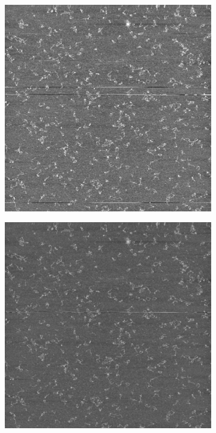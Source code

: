 \documentclass{article}
\begin{document}
\begin{figure}[H]
	\centering
	\begin{subfigure}[b]{0.321\textwidth}
		\includegraphics[width=\linewidth]{original}
		\caption{}
		\label{fig:origNoFilt2}
	\end{subfigure} 
	\hspace{\fill}
	\begin{subfigure}[b]{0.321\textwidth}
		\includegraphics[width=\linewidth]{both_inverse_order}

\end{subfigure}
\end{figure}
\end{document}
